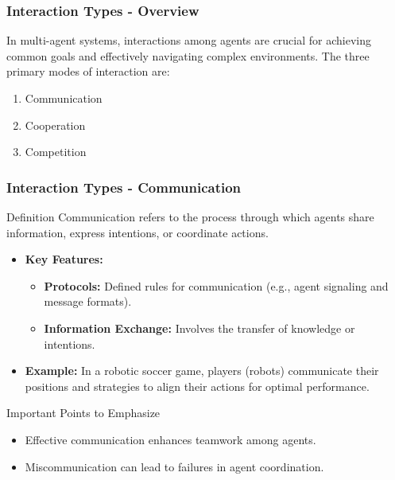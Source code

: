 \documentclass[aspectratio=169]{beamer}
\begin{document}
\begin{frame}[fragile]
    \frametitle{Interaction Types - Overview}
    In multi-agent systems, interactions among agents are crucial for achieving common goals and effectively navigating complex environments. The three primary modes of interaction are:
    \begin{enumerate}
        \item Communication
        \item Cooperation
        \item Competition
    \end{enumerate}
\end{frame}

\begin{frame}[fragile]
    \frametitle{Interaction Types - Communication}
    \begin{block}{Definition}
        Communication refers to the process through which agents share information, express intentions, or coordinate actions.
    \end{block}
    
    \begin{itemize}
        \item \textbf{Key Features:}
        \begin{itemize}
            \item \textbf{Protocols:} Defined rules for communication (e.g., agent signaling and message formats).
            \item \textbf{Information Exchange:} Involves the transfer of knowledge or intentions.
        \end{itemize}
        \item \textbf{Example:} In a robotic soccer game, players (robots) communicate their positions and strategies to align their actions for optimal performance.
    \end{itemize}

    \begin{block}{Important Points to Emphasize}
        \begin{itemize}
            \item Effective communication enhances teamwork among agents.
            \item Miscommunication can lead to failures in agent coordination.
        \end{itemize}
    \end{block}
\end{frame}
\end{document}
